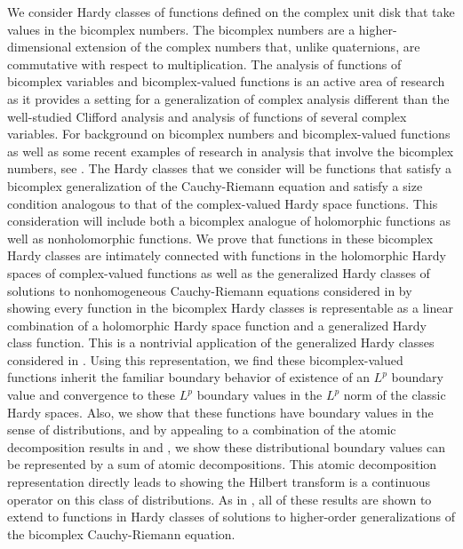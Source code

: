 \documentclass[suppldata]{interact}
\theoremstyle{plain}%
\theoremstyle{definition}
\theoremstyle{remark}
\begin{document}
We consider Hardy classes of functions defined on the complex unit disk that take values in the bicomplex numbers. The bicomplex numbers are a higher-dimensional extension of the complex numbers that, unlike quaternions, are commutative with respect to multiplication. The analysis of functions of bicomplex variables and bicomplex-valued functions is an active area of research as it provides a setting for a generalization of complex analysis different than the well-studied Clifford analysis and analysis of functions of several complex variables. For background on bicomplex numbers and bicomplex-valued functions as well as some recent examples of research in analysis that involve the bicomplex numbers, see \cite{BCTransmutation, BCBergman, FundBicomplex, BicomplexHilbert, KravAPFT, BCHolo,ComplexSchr}. The Hardy classes that we consider will be functions that satisfy a bicomplex generalization of the Cauchy-Riemann equation and satisfy a size condition analogous to that of the complex-valued Hardy space functions. This consideration will include both a bicomplex analogue of holomorphic functions as well as nonholomorphic functions. We prove that functions in these bicomplex Hardy classes are intimately connected with functions in the holomorphic Hardy spaces of complex-valued functions as well as the generalized Hardy classes of solutions to nonhomogeneous Cauchy-Riemann equations considered in \cite{WB} by showing every function in the bicomplex Hardy classes is representable as a linear combination of a holomorphic Hardy space function and a generalized Hardy class function. This is a nontrivial application of the generalized Hardy classes considered in \cite{WB}. Using this representation, we find these bicomplex-valued functions inherit the familiar boundary behavior of existence of an $L^p$ boundary value and convergence to these $L^p$ boundary values in the $L^p$ norm of the classic Hardy spaces. Also, we show that these functions have boundary values in the sense of distributions, and by appealing to a combination of the atomic decomposition results in \cite{GHJH2} and \cite{WB}, we show these distributional boundary values can be represented by a sum of atomic decompositions. This atomic decomposition representation directly leads to showing the Hilbert transform is a continuous operator on this class of distributions. As in \cite{WB}, all of these results are shown to extend to functions in Hardy classes of solutions to higher-order generalizations of the bicomplex Cauchy-Riemann equation. 
\end{document}
